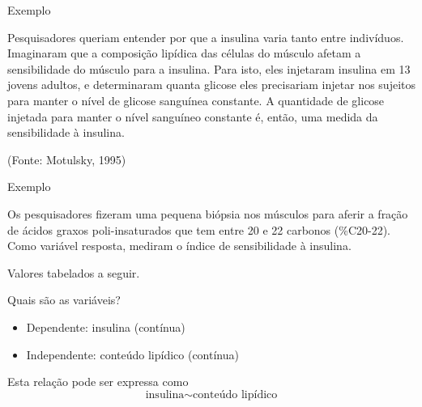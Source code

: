 \documentclass{beamer}
\begin{document}
\begin{frame}{Exemplo}
 \begin{example}
   Pesquisadores queriam entender por que a insulina varia tanto entre
   indivíduos. Imaginaram que a \alert<2>{composição lipídica} das células do
   músculo afetam a \alert<3>{sensibilidade do músculo para a insulina}. Para
   isto, eles injetaram insulina em 13 jovens adultos, e determinaram
   quanta glicose eles precisariam injetar nos sujeitos para manter o
   nível de glicose sanguínea constante. A quantidade de glicose
   injetada para manter o nível sanguíneo constante é, então, uma
   medida da sensibilidade à insulina.


    (Fonte: Motulsky, 1995)
  \end{example}
\end{frame}

\begin{frame}{Exemplo}
  \begin{example}
    Os pesquisadores fizeram uma pequena biópsia nos músculos para
    aferir a fração de ácidos graxos poli-insaturados que tem entre 20
    e 22 carbonos (\%C20-22). Como variável resposta, mediram o índice
    de sensibilidade à insulina.
  \end{example}
  Valores tabelados a seguir.
\end{frame}

\begin{frame}{Quais são as variáveis?}
  \begin{itemize}
  \item Dependente: insulina (contínua)
  \item Independente: conteúdo lipídico (contínua)
  \end{itemize}
  \vfill
  \begin{block}{Esta relação pode ser expressa como}
    \begin{displaymath}
      \text{insulina} \sim \text{conteúdo lipídico}
    \end{displaymath}
  \end{block}
\end{frame}
\end{document}
